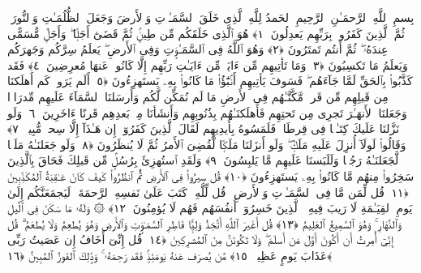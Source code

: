 
  
    
  
    
    

\nopagebreak
  بِسمِ ٱللَّهِ ٱلرَّحمَـٰنِ ٱلرَّحِيمِ
  ٱلحَمدُ لِلَّهِ ٱلَّذِى خَلَقَ ٱلسَّمَـٰوَٟتِ وَٱلأَرضَ وَجَعَلَ ٱلظُّلُمَـٰتِ وَٱلنُّورَ ۖ ثُمَّ ٱلَّذِينَ كَفَرُوا۟ بِرَبِّهِم يَعدِلُونَ ﴿١﴾
 هُوَ ٱلَّذِى خَلَقَكُم مِّن طِينٍۢ ثُمَّ قَضَىٰٓ أَجَلًۭا ۖ وَأَجَلٌۭ مُّسَمًّى عِندَهُۥ ۖ ثُمَّ أَنتُم تَمتَرُونَ ﴿٢﴾
 وَهُوَ ٱللَّهُ فِى ٱلسَّمَـٰوَٟتِ وَفِى ٱلأَرضِ ۖ يَعلَمُ سِرَّكُم وَجَهرَكُم وَيَعلَمُ مَا تَكسِبُونَ ﴿٣﴾
 وَمَا تَأتِيهِم مِّن ءَايَةٍۢ مِّن ءَايَـٰتِ رَبِّهِم إِلَّا كَانُوا۟ عَنهَا مُعرِضِينَ ﴿٤﴾
 فَقَد كَذَّبُوا۟ بِٱلحَقِّ لَمَّا جَآءَهُم ۖ فَسَوفَ يَأتِيهِم أَنۢبَٰٓؤُا۟ مَا كَانُوا۟ بِهِۦ يَستَهزِءُونَ ﴿٥﴾
 أَلَم يَرَوا۟ كَم أَهلَكنَا مِن قَبلِهِم مِّن قَرنٍۢ مَّكَّنَّـٰهُم فِى ٱلأَرضِ مَا لَم نُمَكِّن لَّكُم وَأَرسَلنَا ٱلسَّمَآءَ عَلَيهِم مِّدرَارًۭا وَجَعَلنَا ٱلأَنهَـٰرَ تَجرِى مِن تَحتِهِم فَأَهلَكنَـٰهُم بِذُنُوبِهِم وَأَنشَأنَا مِنۢ بَعدِهِم قَرنًا ءَاخَرِينَ ﴿٦﴾
 وَلَو نَزَّلنَا عَلَيكَ كِتَـٰبًۭا فِى قِرطَاسٍۢ فَلَمَسُوهُ بِأَيدِيهِم لَقَالَ ٱلَّذِينَ كَفَرُوٓا۟ إِن هَـٰذَآ إِلَّا سِحرٌۭ مُّبِينٌۭ ﴿٧﴾
 وَقَالُوا۟ لَولَآ أُنزِلَ عَلَيهِ مَلَكٌۭ ۖ وَلَو أَنزَلنَا مَلَكًۭا لَّقُضِىَ ٱلأَمرُ ثُمَّ لَا يُنظَرُونَ ﴿٨﴾
 وَلَو جَعَلنَـٰهُ مَلَكًۭا لَّجَعَلنَـٰهُ رَجُلًۭا وَلَلَبَسنَا عَلَيهِم مَّا يَلبِسُونَ ﴿٩﴾
 وَلَقَدِ ٱستُهزِئَ بِرُسُلٍۢ مِّن قَبلِكَ فَحَاقَ بِٱلَّذِينَ سَخِرُوا۟ مِنهُم مَّا كَانُوا۟ بِهِۦ يَستَهزِءُونَ ﴿١٠﴾
 قُل سِيرُوا۟ فِى ٱلأَرضِ ثُمَّ ٱنظُرُوا۟ كَيفَ كَانَ عَـٰقِبَةُ ٱلمُكَذِّبِينَ ﴿١١﴾
 قُل لِّمَن مَّا فِى ٱلسَّمَـٰوَٟتِ وَٱلأَرضِ ۖ قُل لِّلَّهِ ۚ كَتَبَ عَلَىٰ نَفسِهِ ٱلرَّحمَةَ ۚ لَيَجمَعَنَّكُم إِلَىٰ يَومِ ٱلقِيَـٰمَةِ لَا رَيبَ فِيهِ ۚ ٱلَّذِينَ خَسِرُوٓا۟ أَنفُسَهُم فَهُم لَا يُؤمِنُونَ ﴿١٢﴾
 ۞ وَلَهُۥ مَا سَكَنَ فِى ٱلَّيلِ وَٱلنَّهَارِ ۚ وَهُوَ ٱلسَّمِيعُ ٱلعَلِيمُ ﴿١٣﴾
 قُل أَغَيرَ ٱللَّهِ أَتَّخِذُ وَلِيًّۭا فَاطِرِ ٱلسَّمَـٰوَٟتِ وَٱلأَرضِ وَهُوَ يُطعِمُ وَلَا يُطعَمُ ۗ قُل إِنِّىٓ أُمِرتُ أَن أَكُونَ أَوَّلَ مَن أَسلَمَ ۖ وَلَا تَكُونَنَّ مِنَ ٱلمُشرِكِينَ ﴿١٤﴾
 قُل إِنِّىٓ أَخَافُ إِن عَصَيتُ رَبِّى عَذَابَ يَومٍ عَظِيمٍۢ ﴿١٥﴾
 مَّن يُصرَف عَنهُ يَومَئِذٍۢ فَقَد رَحِمَهُۥ ۚ وَذَٟلِكَ ٱلفَوزُ ٱلمُبِينُ ﴿١٦﴾
